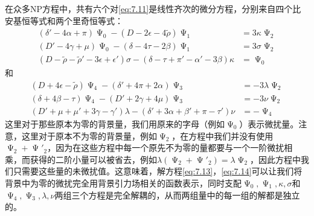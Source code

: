 在众多NP方程中，共有六个对\ref{eq:7.11}是线性齐次的微分方程，分别来自四个比安基恒等式和两个里奇恒等式：
\begin{equation}
	\begin{aligned}
		(\delta '-4\alpha +\pi )\upPsi _{0} -(D-2\epsilon -4\tilde{\rho } )\upPsi _{1} & =3\kappa \upPsi _{2}\\
		(D'-4\gamma +\mu )\upPsi _{0} -(\delta -4\tau -2\beta )\upPsi _{1} & =3\sigma \upPsi _{2}\\
		(D-\tilde{\rho } -\tilde{\rho } '-3\epsilon +\epsilon ')\sigma -( \delta -\tau +\pi '-\alpha '-3\beta ) \kappa  & =\upPsi _{0}
	\end{aligned}
	\label{eq:7.13}
\end{equation}
和
\begin{equation}
	\begin{aligned}
		(D+4\epsilon -\tilde{\rho } )\upPsi _{4} -( \delta '+4\pi +2\alpha ) \upPsi _{3} & =-3\lambda \upPsi _{2}\\
		(\delta +4\beta -\tau )\upPsi _{4} -(D'+2\gamma +4\mu )\upPsi _{3} & =-3\nu \upPsi _{2}\\
		( D'+\mu +\mu '+3\gamma -\gamma ') \lambda -( \delta '+3\alpha +\beta '+\pi -\tau ') \nu  & =-\upPsi _{4}
	\end{aligned}
	\label{eq:7.14}
\end{equation}
这里对于那些原本为零的背景量，我们用原来的字母（例如$\upPsi _{0}$）表示微扰量。注意，这里对于原本不为零的背景量，例如$\upPsi _{2}$，在方程中我们并没有使用$\upPsi _{2} +\upPsi '_{2}$，因为在这些方程中每一个原先不为零的量都要与一个一阶微扰相乘，而获得的二阶小量可以被省去，例如$\lambda (\upPsi _{2} +\upPsi '_{2} )=\lambda \upPsi _{2}$，因此方程中我们只需要这些量的未微扰值。这意味着，解方程\ref{eq:7.13}，\ref{eq:7.14}可以让我们将背景中为零的微扰完全用背景引力场相关的函数表示，同时支配$\upPsi _{0} ,\upPsi _{1} ,\kappa ,\sigma $和$\upPsi _{4} ,\upPsi _{3} ,\lambda ,\nu $两组三个方程是完全解耦的，从而两组量中的每一组的解都是独立的。



